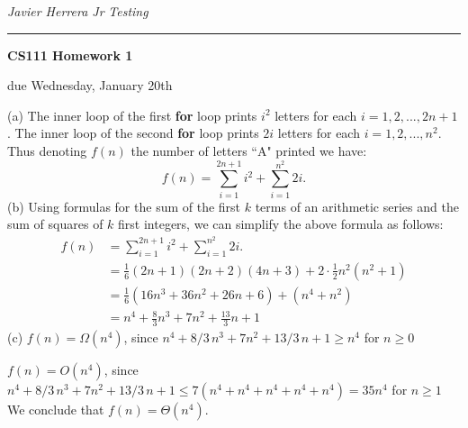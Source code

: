 \documentclass[11pt]{article}
\newcommand{\student}[1]{{\noindent\Large\em {#1} \hfill}\vskip 0.1in}
\newcommand{\assignment}[1]{\centerline{\large\bf CS111 Homework {#1}}}
\newcommand{\duedate}[1]{{\centerline{due {#1}}}}
\newcounter{prnum}
\newenvironment{problem}{{\vskip 0.2in\noindent\bf Problem
       \addtocounter{prnum}{1} \arabic{prnum}.}}{\vskip 0.1in}
\begin{document}
\student{Javier Herrera Jr} %
\student{Testing} %
\vskip 0.1in\noindent\hrule\vskip 0.2in
\assignment{1}                           %
\duedate{Wednesday, January 20th}              %


\begin{problem}
\noindent(a) 
The inner loop of the first \textbf{for} loop prints $i^2$ letters for each $i = 1,2,...,2n+1$. The inner loop of the second \textbf{for} loop prints $2i$ letters for each $i = 1,2,...,n^2$.
Thus denoting $f(n)$ the number of letters ``A" printed we have:
\begin{equation*}
    f(n) = \sum_{i=1}^{2n+1} i^2 + \sum_{i=1}^{n^2}2i.
\end{equation*}
%
\noindent (b)
Using formulas for the sum of the first $k$ terms of an arithmetic series and the sum of squares of $k$ first integers, we can simplify the above formula as follows:
% 
\begin{align*}
    f(n) &= \sum_{i=1}^{2n+1} i^2 + \sum_{i=1}^{n^2}2i.
    \\
    &= \frac16 (2n+1)(2n+2)(4n+3) + 2 \cdot \frac12 n^2(n^2+1)
    \\
    &= \frac16 (16n^3+36n^2+26n+6) + (n^4+n^2)
    \\
    &= n^4 + \frac83 n^3 + 7n^2+ \frac{13}{3}n + 1
\end{align*}
%
\noindent (c)
$f(n) = \Omega(n^4)$, since $n^4 + 8/3 \, n^3 + 7n^2+ 13/3 \, n + 1 \geq n^4$ for $n \ge 0$

$f(n) = O(n^4)$, since 
$n^4 + 8/3 \, n^3 + 7n^2+ 13/3 \, n + 1 \leq 7(n^4 + n^4 +n^4 +n^4 + n^4) = 35 n^4$ for $n \ge 1$\\
We conclude that $f(n) = \Theta(n^4)$.
\end{problem}
\end{document}
